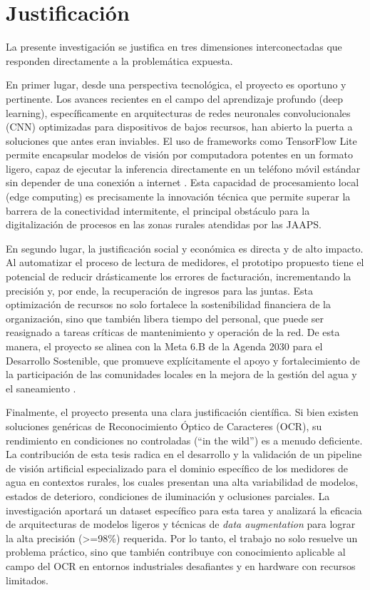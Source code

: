 \section{Justificación}
\label{sec:justification}

La presente investigación se justifica en tres dimensiones interconectadas que responden directamente a la problemática expuesta.

En primer lugar, desde una perspectiva tecnológica, el proyecto es oportuno y pertinente. Los avances recientes en el campo del aprendizaje profundo (deep learning), específicamente en arquitecturas de redes neuronales convolucionales (CNN) optimizadas para dispositivos de bajos recursos, han abierto la puerta a soluciones que antes eran inviables. El uso de frameworks como TensorFlow Lite permite encapsular modelos de visión por computadora potentes en un formato ligero, capaz de ejecutar la inferencia directamente en un teléfono móvil estándar sin depender de una conexión a internet \parencite{Carvalho2023}. Esta capacidad de procesamiento local (edge computing) es precisamente la innovación técnica que permite superar la barrera de la conectividad intermitente, el principal obstáculo para la digitalización de procesos en las zonas rurales atendidas por las JAAPS.

En segundo lugar, la justificación social y económica es directa y de alto impacto. Al automatizar el proceso de lectura de medidores, el prototipo propuesto tiene el potencial de reducir drásticamente los errores de facturación, incrementando la precisión y, por ende, la recuperación de ingresos para las juntas. Esta optimización de recursos no solo fortalece la sostenibilidad financiera de la organización, sino que también libera tiempo del personal, que puede ser reasignado a tareas críticas de mantenimiento y operación de la red. De esta manera, el proyecto se alinea con la Meta 6.B de la Agenda 2030 para el Desarrollo Sostenible, que promueve explícitamente el apoyo y fortalecimiento de la participación de las comunidades locales en la mejora de la gestión del agua y el saneamiento \parencite{NacionesUnidas2015}.

Finalmente, el proyecto presenta una clara justificación científica. Si bien existen soluciones genéricas de Reconocimiento Óptico de Caracteres (OCR), su rendimiento en condiciones no controladas (``in the wild'') es a menudo deficiente. La contribución de esta tesis radica en el desarrollo y la validación de un pipeline de visión artificial especializado para el dominio específico de los medidores de agua en contextos rurales, los cuales presentan una alta variabilidad de modelos, estados de deterioro, condiciones de iluminación y oclusiones parciales. La investigación aportará un dataset específico para esta tarea y analizará la eficacia de arquitecturas de modelos ligeros y técnicas de \textit{data augmentation} para lograr la alta precisión (\textgreater=98\%) requerida. Por lo tanto, el trabajo no solo resuelve un problema práctico, sino que también contribuye con conocimiento aplicable al campo del OCR en entornos industriales desafiantes y en hardware con recursos limitados.

